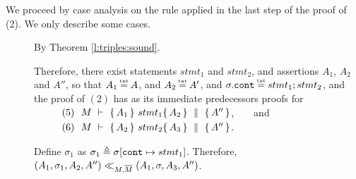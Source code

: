 \vspace{.2cm}
\noindent
We proceed by case analysis on the  rule applied in the last step of the proof of (2). We only describe some cases.

\begin{description} 
 
 \item[{}] 
 
 By Theorem \ref{l:triples:sound}.

\newcommand{\SPS}{\strut \ \ \hspace{0.5cm} \ \ }
 
\item[{}] 
Therefore, there exist statements $stmt_1$ and $stmt_2$, and assertions  $A_1$, $A_2$ and $A''$, so that $A_1\txteq A$, and $A_2 \txteq A'$, and $\sigma.\prg{cont}\txteq  stmt_1; stmt_2$, and 
the proof of  $(2)$ %
has as its immediate predecessors proofs for \\
$\SPS (5)\ \ M\ \vdash\  \quadruple {A_1} {stmt_1} {A_2} {A''}$,\ \ \ \  and\\
$\SPS (6)\ \  M\ \vdash\  \quadruple {A_2} {stmt_2} {A_3} {A''}$.

Define $\sigma_1$ as  $\sigma_1 \triangleq \sigma[\mbox{\normalfont{\texttt{cont}}} \mapsto stmt_1]$.
Therefore,  $(A_1,\sigma_1,A_2, A'') \ll_{M,\overline{M}} (A_1,\sigma,A_3, A'')$. 


\end{description}
